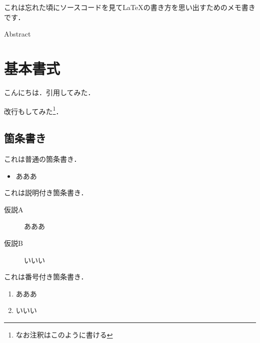 \documentclass[a4j,8pt,fleqn]{jarticle}
\begin{document}

\ifENG
{}
\fi


\ifENG
{}
\fi


\ifENG
{}
\fi

\begin{jabstract}
これは忘れた頃にソースコードを見てLaTeXの書き方を思い出すためのメモ書きです．
\end{jabstract}

\ifENG
\begin{eabstract}
Abstract
\end{eabstract}
\fi

\maketitle
\thispagestyle{empty}

\section{基本書式}
こんにちは．引用\cite{sample}してみた．\par
改行もしてみた\footnote{なお注釈はこのように書ける}．

\subsection{箇条書き}
これは普通の箇条書き．
\begin{itemize}
\item あああ
\end{itemize}
\par
これは説明付き箇条書き．
\begin{description}
 \item[仮説A]あああ
 \item[仮説B]いいい
\end{description}
\par
これは番号付き箇条書き．
\begin{enumerate}
  \item あああ
  \item いいい
\end{enumerate}
\end{document}
